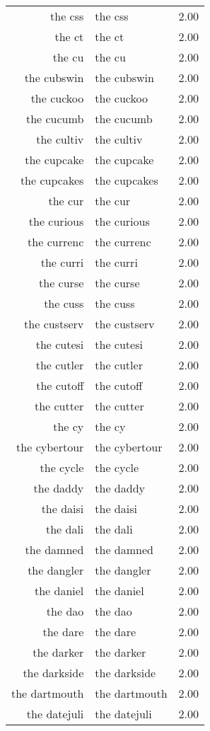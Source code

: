 \begin{table}[ht]
\begin{tabular}{rlr}
  the css & the css & 2.00 \\ 
  the ct & the ct & 2.00 \\ 
  the cu & the cu & 2.00 \\ 
  the cubswin & the cubswin & 2.00 \\ 
  the cuckoo & the cuckoo & 2.00 \\ 
  the cucumb & the cucumb & 2.00 \\ 
  the cultiv & the cultiv & 2.00 \\ 
  the cupcake & the cupcake & 2.00 \\ 
  the cupcakes & the cupcakes & 2.00 \\ 
  the cur & the cur & 2.00 \\ 
  the curious & the curious & 2.00 \\ 
  the currenc & the currenc & 2.00 \\ 
  the curri & the curri & 2.00 \\ 
  the curse & the curse & 2.00 \\ 
  the cuss & the cuss & 2.00 \\ 
  the custserv & the custserv & 2.00 \\ 
  the cutesi & the cutesi & 2.00 \\ 
  the cutler & the cutler & 2.00 \\ 
  the cutoff & the cutoff & 2.00 \\ 
  the cutter & the cutter & 2.00 \\ 
  the cy & the cy & 2.00 \\ 
  the cybertour & the cybertour & 2.00 \\ 
  the cycle & the cycle & 2.00 \\ 
  the daddy & the daddy & 2.00 \\ 
  the daisi & the daisi & 2.00 \\ 
  the dali & the dali & 2.00 \\ 
  the damned & the damned & 2.00 \\ 
  the dangler & the dangler & 2.00 \\ 
  the daniel & the daniel & 2.00 \\ 
  the dao & the dao & 2.00 \\ 
  the dare & the dare & 2.00 \\ 
  the darker & the darker & 2.00 \\ 
  the darkside & the darkside & 2.00 \\ 
  the dartmouth & the dartmouth & 2.00 \\ 
  the datejuli & the datejuli & 2.00 \\ 

\end{tabular}
\end{table}
